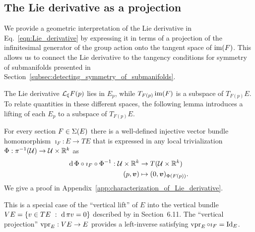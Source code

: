 \documentclass[twoside,11pt]{article}
\begin{document}
\subsection{The Lie derivative as a projection}

We provide a geometric interpretation of the Lie derivative in Eq.~\ref{eqn:Lie_derivative} by expressing it in terms of a projection of the infinitesimal generator of the group action onto the tangent space of $\operatorname{im}(F)$.
This allows us to connect the Lie derivative to the tangency conditions for symmetry of submanifolds presented in Section~\ref{subsec:detecting_symmetry_of_submanifolds}.

The Lie derivative ${\mathcal{L}}_{\xi} F(p)$ lies in $E_p$, while $T_{F(p)}\operatorname{im}(F)$ is a subspace of $T_{F(p)} E$.
To relate quantities in these different spaces, the following lemma introduces a lifting of each $E_p$ to a subspace of $T_{F(p)} E$.
\begin{lemma}
    \label{lem:injection_of_E_into_TE}
    For every section $F\in \operatorname{\Sigma}(E)$ there is a well-defined injective vector bundle homomorphism $\imath_F : E \to T E$ that 
    is expressed in any local trivialization $\Phi : \pi^{-1}({\mathcal{U}}) \to {\mathcal{U}} \times \mathbb{R}^k$ as
    \begin{equation}
    \begin{aligned}
        \operatorname{\mathrm{d}}\Phi \circ \imath_F \circ \Phi^{-1} : {\mathcal{U}} \times \mathbb{R}^k &\to T({\mathcal{U}} \times \mathbb{R}^k) \\
        (p, {\boldsymbol{v}}) &\mapsto (0, {\boldsymbol{v}})_{\Phi(F(p))}.
    \end{aligned}
    \label{eqn:injection_E_to_TE}
    \end{equation}
    We give a proof in Appendix~\ref{app:characterization_of_Lie_derivative}.
\end{lemma}
This is a special case of the ``vertical lift'' of $E$ into the vertical bundle $V E = \{ v\in TE \ : \ \operatorname{\mathrm{d}} \pi v = 0 \}$ described by \cite{Kolar1993natural} in Section~6.11.
The ``vertical projection'' $\operatorname{vpr}_E: VE \to E$ provides a left-inverse satisfying $\operatorname{vpr}_E \circ \imath_F = \operatorname{Id}_E$.
\end{document}
